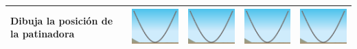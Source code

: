 \begin{table}[H]
\begin{tabular}{|p{1.8cm}|c|c|c|c|}
        Dibuja la posición de la patinadora & \includegraphics[width=100pt]{../images/pista} & \includegraphics[width=100pt]{../images/pista} & \includegraphics[width=100pt]{../images/pista}         & \includegraphics[width=100pt]{../images/pista}    \\ \hline
    \end{tabular}
    \label{tab:q25}
\end{table}